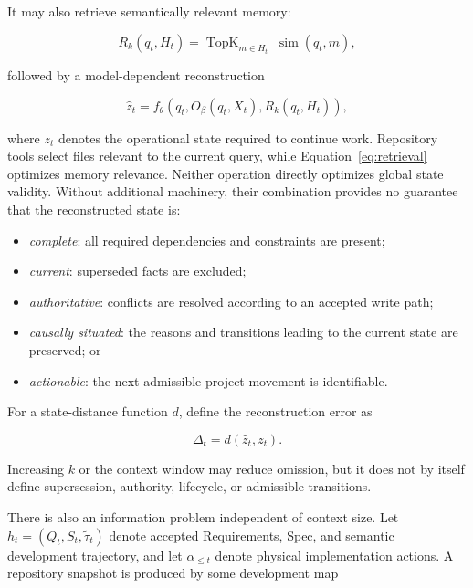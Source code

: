 \documentclass[11pt]{article}
\newcommand{\TopK}{\operatorname{TopK}}
\theoremstyle{definition}
\begin{document}
It may also retrieve semantically relevant memory:

\begin{equation}
  R_k(q_t,H_t)
  =
  \TopK_{m\in H_t}\; \operatorname{sim}(q_t,m),
  \label{eq:retrieval}
\end{equation}

followed by a model-dependent reconstruction

\begin{equation}
  \widehat{z}_t
  =
  f_\theta\!\left(
    q_t,
    O_\beta(q_t,X_t),
    R_k(q_t,H_t)
  \right),
  \label{eq:reconstruction}
\end{equation}

where $z_t$ denotes the operational state required to continue work.
Repository tools select files relevant to the current query, while
Equation~\ref{eq:retrieval} optimizes memory relevance.  Neither operation
directly optimizes global state validity.  Without additional machinery, their
combination provides no guarantee that the reconstructed state is:

\begin{itemize}
  \item \emph{complete}: all required dependencies and constraints are present;
  \item \emph{current}: superseded facts are excluded;
  \item \emph{authoritative}: conflicts are resolved according to an accepted
        write path;
  \item \emph{causally situated}: the reasons and transitions leading to the
        current state are preserved; or
  \item \emph{actionable}: the next admissible project movement is identifiable.
\end{itemize}

For a state-distance function $d$, define the reconstruction error as

\begin{equation}
  \Delta_t = d(\widehat{z}_t,z_t).
  \label{eq:state-gap}
\end{equation}

Increasing $k$ or the context window may reduce omission, but it does not by
itself define supersession, authority, lifecycle, or admissible transitions.

There is also an information problem independent of context size.  Let
$h_t=(Q_t,S_t,\widetilde{\tau}_t)$ denote accepted Requirements, Spec, and
semantic development trajectory, and let $\alpha_{\leq t}$ denote physical
implementation actions.  A repository snapshot is produced by some development
map
\end{document}
